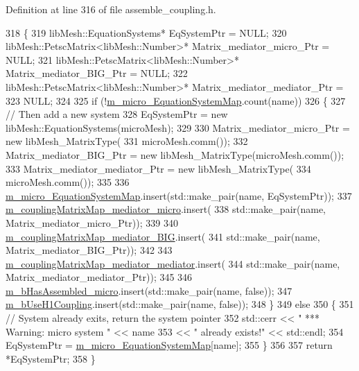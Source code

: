 Definition at line 316 of file assemble\+\_\+coupling.\+h.


\begin{DoxyCode}
318     \{
319         libMesh::EquationSystems* EqSystemPtr = NULL;
320         libMesh::PetscMatrix<libMesh::Number>* Matrix\_mediator\_micro\_Ptr = NULL;
321         libMesh::PetscMatrix<libMesh::Number>* Matrix\_mediator\_BIG\_Ptr = NULL;
322         libMesh::PetscMatrix<libMesh::Number>* Matrix\_mediator\_mediator\_Ptr =
323         NULL;
324 
325         \textcolor{keywordflow}{if} (!\hyperlink{classcarl_1_1assemble__coupling__matrices_a13fddbcb853df9b7ce1a99062fb9f8b6}{m\_micro\_EquationSystemMap}.count(name))
326         \{
327             \textcolor{comment}{// Then add a new system}
328             EqSystemPtr = \textcolor{keyword}{new} libMesh::EquationSystems(microMesh);
329 
330             Matrix\_mediator\_micro\_Ptr = \textcolor{keyword}{new} libMesh\_MatrixType(
331                     microMesh.comm());
332             Matrix\_mediator\_BIG\_Ptr = \textcolor{keyword}{new} libMesh\_MatrixType(microMesh.comm());
333             Matrix\_mediator\_mediator\_Ptr = \textcolor{keyword}{new} libMesh\_MatrixType(
334                     microMesh.comm());
335 
336             \hyperlink{classcarl_1_1assemble__coupling__matrices_a13fddbcb853df9b7ce1a99062fb9f8b6}{m\_micro\_EquationSystemMap}.insert(std::make\_pair(name, EqSystemPtr));
337             \hyperlink{classcarl_1_1assemble__coupling__matrices_a73accf79c46d9ceab7f66f0e26c5e677}{m\_couplingMatrixMap\_mediator\_micro}.insert(
338                     std::make\_pair(name, Matrix\_mediator\_micro\_Ptr));
339 
340             \hyperlink{classcarl_1_1assemble__coupling__matrices_af8127910d360a01b1b9c9878f03282f4}{m\_couplingMatrixMap\_mediator\_BIG}.insert(
341                     std::make\_pair(name, Matrix\_mediator\_BIG\_Ptr));
342 
343             \hyperlink{classcarl_1_1assemble__coupling__matrices_a1a838735ff335cdf1d24403ceab3b896}{m\_couplingMatrixMap\_mediator\_mediator}.insert(
344                     std::make\_pair(name, Matrix\_mediator\_mediator\_Ptr));
345 
346             \hyperlink{classcarl_1_1assemble__coupling__matrices_a84f7dc1f435eabc152f0df50d7650269}{m\_bHasAssembled\_micro}.insert(std::make\_pair(name, \textcolor{keyword}{false}));
347             \hyperlink{classcarl_1_1assemble__coupling__matrices_a9e3bf058bd10aacb63ebbab34fe37628}{m\_bUseH1Coupling}.insert(std::make\_pair(name, \textcolor{keyword}{false}));
348         \}
349         \textcolor{keywordflow}{else}
350         \{
351             \textcolor{comment}{// System already exits, return the system pointer}
352             std::cerr << \textcolor{stringliteral}{" *** Warning: micro system "} << name
353                     << \textcolor{stringliteral}{" already exists!"} << std::endl;
354             EqSystemPtr = \hyperlink{classcarl_1_1assemble__coupling__matrices_a13fddbcb853df9b7ce1a99062fb9f8b6}{m\_micro\_EquationSystemMap}[name];
355         \}
356 
357         \textcolor{keywordflow}{return} *EqSystemPtr;
358     \}
\end{DoxyCode}
